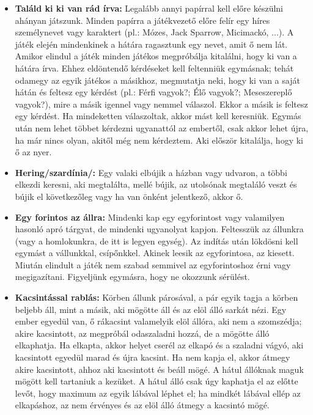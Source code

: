 \documentclass[a4paper, 12pt, twoside, openright]{article}
\begin{document}
\begin{itemize}
\item \textbf{Találd ki ki van rád írva:} Legalább annyi papírral kell előre készülni ahányan játszunk. Minden papírra a játékvezető előre felír egy híres személynevet vagy karaktert (pl.: Mózes, Jack Sparrow, Micimackó, ...). A játék elején mindenkinek a hátára ragasztunk egy nevet, amit ő nem lát. Amikor elindul a játék minden játékos megpróbálja kitalálni, hogy ki van a hátára írva. Ehhez eldöntendő kérdéseket kell feltenniük egymásnak; tehát odamegy az egyik játékos a másikhoz, megmutatja neki, hogy ki van a saját hátán és feltesz egy kérdést (pl.: Férfi vagyok?; Élő vagyok?; Meseszereplő vagyok?), mire a másik igennel vagy nemmel válaszol. Ekkor a másik is feltesz egy kérdést. Ha mindeketten válaszoltak, akkor mást kell keresniük. Egymás után nem lehet többet kérdezni ugyanattól az embertől, csak akkor lehet újra, ha már nincs olyan, akitől még nem kérdeztem. Aki először kitalálja, hogy ki ő az nyer.

\item \textbf{Hering/szardínia/:} Egy valaki elbújik a házban vagy udvaron, a többi elkezdi keresni, aki megtalálta, mellé bújik, az utolsónak megtaláló veszt és bújik el következőleg vagy ha van önként jelentkező, akkor ő.

\item \textbf{Egy forintos az állra:} Mindenki kap egy egyforintost vagy valamilyen hasonló apró tárgyat, de mindenki ugyanolyat kapjon. Feltesszük az állunkra (vagy a homlokunkra, de itt is legyen egység). Az indítás után lökdösni kell egymást a vállunkkal, csípőnkkel. Akinek leesik az egyforintosa, az kiesett. Miután elindult a játék nem szabad semmivel az egyforintoshoz érni vagy megigazítani. Figyeljünk egymásra, hogy ne okozzunk sérülést.

\item \textbf{Kacsintással rablás:} Körben állunk párosával, a pár egyik tagja a körben beljebb áll, mint a másik, aki mögötte áll és az elöl álló sarkát nézi. Egy ember egyedül van, ő rákacsint valamelyik elöl állóra, aki nem a szomszédja; akire kacsintott, az megpróbál odaszaladni hozzá, de a mögötte álló elkaphatja. Ha elkapta, akkor helyet cserél az elkapó és a szaladni vágyó, aki kacsintott egyedül marad és újra kacsint. Ha nem kapja el, akkor átmegy akire kacsintott, ahhoz aki kacsintott és beáll mögé. A hátul állóknak maguk mögött kell tartaniuk a kezüket. A hátul álló csak úgy kaphatja el az előtte levőt, hogy maximum az egyik lábával léphet el; ha mindkét lábával ellép az elkapáshoz, az nem érvényes és az elöl álló átmegy a kacsintó mögé.


\end{itemize}
\end{document}
